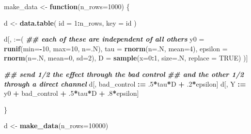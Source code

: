 \documentclass[
]{article}
\newenvironment{Shaded}{\begin{snugshade}}{\end{snugshade}}
\newcommand{\AttributeTok}[1]{\textcolor[rgb]{0.13,0.29,0.53}{#1}}
\newcommand{\ConstantTok}[1]{\textcolor[rgb]{0.56,0.35,0.01}{#1}}
\newcommand{\ControlFlowTok}[1]{\textcolor[rgb]{0.13,0.29,0.53}{\textbf{#1}}}
\newcommand{\DecValTok}[1]{\textcolor[rgb]{0.00,0.00,0.81}{#1}}
\newcommand{\DocumentationTok}[1]{\textcolor[rgb]{0.56,0.35,0.01}{\textbf{\textit{#1}}}}
\newcommand{\FunctionTok}[1]{\textcolor[rgb]{0.13,0.29,0.53}{\textbf{#1}}}
\newcommand{\NormalTok}[1]{#1}
\newcommand{\OtherTok}[1]{\textcolor[rgb]{0.56,0.35,0.01}{#1}}
\newcommand{\SpecialCharTok}[1]{\textcolor[rgb]{0.81,0.36,0.00}{\textbf{#1}}}
\newcommand{\StringTok}[1]{\textcolor[rgb]{0.31,0.60,0.02}{#1}}
\theoremstyle{definition}
\theoremstyle{definition}
\theoremstyle{definition}
\theoremstyle{definition}
\theoremstyle{remark}
\begin{document}
\begin{Shaded}
\begin{Highlighting}[]
\NormalTok{make\_data }\OtherTok{\textless{}{-}} \ControlFlowTok{function}\NormalTok{(}\AttributeTok{n\_rows=}\DecValTok{1000}\NormalTok{) \{ }

\NormalTok{  d }\OtherTok{\textless{}{-}} \FunctionTok{data.table}\NormalTok{(}
    \AttributeTok{id =} \DecValTok{1}\SpecialCharTok{:}\NormalTok{n\_rows, }
    \AttributeTok{key =} \StringTok{\textquotesingle{}id\textquotesingle{}}
\NormalTok{    )}
  
\NormalTok{  d[, }\StringTok{\textquotesingle{}:=\textquotesingle{}}\NormalTok{(}
    \DocumentationTok{\#\# each of these are independent of all others}
    \AttributeTok{y0           =} \FunctionTok{runif}\NormalTok{(}\AttributeTok{min=}\SpecialCharTok{{-}}\DecValTok{10}\NormalTok{, }\AttributeTok{max=}\DecValTok{10}\NormalTok{, }\AttributeTok{n=}\NormalTok{.N), }
    \AttributeTok{tau          =} \FunctionTok{rnorm}\NormalTok{(}\AttributeTok{n=}\NormalTok{.N, }\AttributeTok{mean=}\DecValTok{4}\NormalTok{), }
    \AttributeTok{epsilon      =} \FunctionTok{rnorm}\NormalTok{(}\AttributeTok{n=}\NormalTok{.N, }\AttributeTok{mean=}\DecValTok{0}\NormalTok{, }\AttributeTok{sd=}\DecValTok{2}\NormalTok{), }
    \AttributeTok{D            =} \FunctionTok{sample}\NormalTok{(}\AttributeTok{x=}\DecValTok{0}\SpecialCharTok{:}\DecValTok{1}\NormalTok{, }\AttributeTok{size=}\NormalTok{.N, }\AttributeTok{replace =} \ConstantTok{TRUE}\NormalTok{)}
\NormalTok{  )]}

  \DocumentationTok{\#\# send 1/2 the effect through the bad control}
  \DocumentationTok{\#\# and the other 1/2 through a direct channel}
\NormalTok{  d[, bad\_control }\SpecialCharTok{:=}\NormalTok{ .}\DecValTok{5}\SpecialCharTok{*}\NormalTok{tau}\SpecialCharTok{*}\NormalTok{D }\SpecialCharTok{+}\NormalTok{ .}\DecValTok{2}\SpecialCharTok{*}\NormalTok{epsilon]}
\NormalTok{  d[, Y }\SpecialCharTok{:=}\NormalTok{ y0 }\SpecialCharTok{+}\NormalTok{ bad\_control }\SpecialCharTok{+}\NormalTok{ .}\DecValTok{5}\SpecialCharTok{*}\NormalTok{tau}\SpecialCharTok{*}\NormalTok{D }\SpecialCharTok{+}\NormalTok{ .}\DecValTok{8}\SpecialCharTok{*}\NormalTok{epsilon]}
  
\NormalTok{  \}}

\NormalTok{d }\OtherTok{\textless{}{-}} \FunctionTok{make\_data}\NormalTok{(}\AttributeTok{n\_rows=}\DecValTok{10000}\NormalTok{)}
\end{Highlighting}
\end{Shaded}
\end{document}
